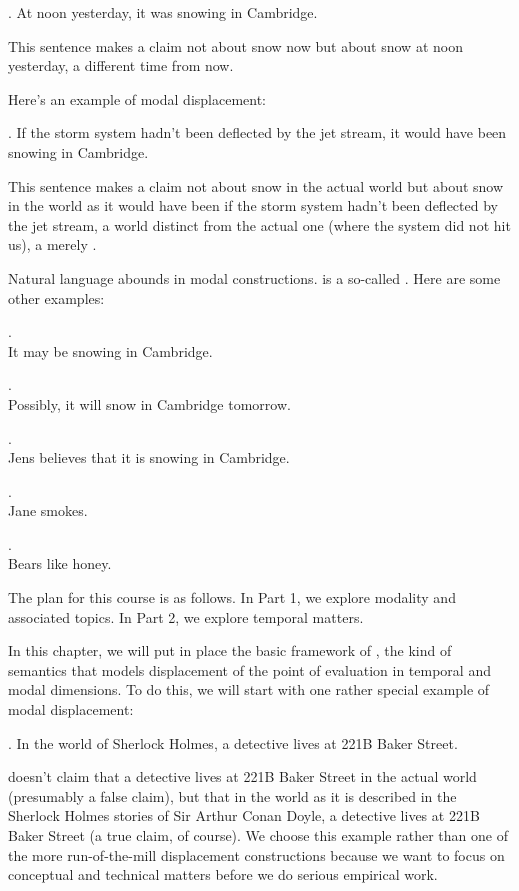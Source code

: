 \ex. At noon yesterday, it was snowing in Cambridge.

This sentence makes a claim not about snow now but about snow at noon yesterday, a different time from now.

Here's an example of modal displacement:

\ex. If the storm system hadn't been deflected by the jet stream, it would have been snowing in Cambridge.

This sentence makes a claim not about snow in the actual world but about snow in the world as it would have been if the storm system hadn't been deflected by the jet stream, a world distinct from the actual one (where the system did not hit us), a merely .

Natural language abounds in modal constructions. \Last is a so-called . Here are some other examples:

\ex. \\
It may be snowing in Cambridge.

\ex. \\
Possibly, it will snow in Cambridge tomorrow.

\ex. \\
Jens believes that it is snowing in Cambridge.

\ex. \\
Jane smokes.

\ex. \\
Bears like honey.

The plan for this course is as follows. In Part 1, we explore modality and associated topics. In Part 2, we explore temporal matters. 

In this chapter, we will put in place the basic framework of , the kind of semantics that models displacement of the point of evaluation in temporal and modal dimensions. To do this, we will start with one rather special example of modal displacement:

\ex.\label{sherlock} In the world of Sherlock Holmes, a detective lives at 221B Baker Street.

\Last{} doesn't claim that a detective lives at 221B Baker Street in the actual world (presumably a false claim), but that in the world as it is described in the Sherlock Holmes stories of Sir Arthur Conan Doyle, a detective lives at 221B Baker Street (a true claim, of course). We choose this example rather than one of the more run-of-the-mill displacement constructions because we want to focus on conceptual and technical matters before we do serious empirical work.

